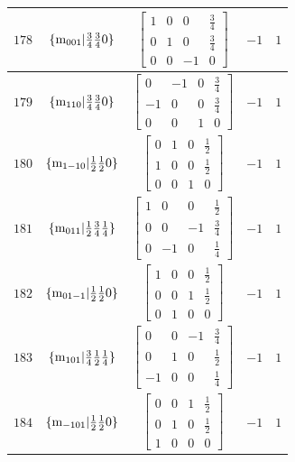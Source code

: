 \documentclass[fleqn,8pt]{jsarticle}
\begin{document}
\begin{longtable}{ccccc}
$ 178 $ & $ \{{\rm m}_{001}|\frac{3}{4} \frac{3}{4} 0\} $ & $ \begin{bmatrix} 1 & 0 & 0 & \frac{3}{4} \\ 0 & 1 & 0 & \frac{3}{4} \\ 0 & 0 & -1 & 0 \end{bmatrix} $ & $ -1 $ & $ 1 $ \\ \hline
$ 179 $ & $ \{{\rm m}_{110}|\frac{3}{4} \frac{3}{4} 0\} $ & $ \begin{bmatrix} 0 & -1 & 0 & \frac{3}{4} \\ -1 & 0 & 0 & \frac{3}{4} \\ 0 & 0 & 1 & 0 \end{bmatrix} $ & $ -1 $ & $ 1 $ \\ \hline
$ 180 $ & $ \{{\rm m}_{1-10}|\frac{1}{2} \frac{1}{2} 0\} $ & $ \begin{bmatrix} 0 & 1 & 0 & \frac{1}{2} \\ 1 & 0 & 0 & \frac{1}{2} \\ 0 & 0 & 1 & 0 \end{bmatrix} $ & $ -1 $ & $ 1 $ \\ \hline
$ 181 $ & $ \{{\rm m}_{011}|\frac{1}{2} \frac{3}{4} \frac{1}{4}\} $ & $ \begin{bmatrix} 1 & 0 & 0 & \frac{1}{2} \\ 0 & 0 & -1 & \frac{3}{4} \\ 0 & -1 & 0 & \frac{1}{4} \end{bmatrix} $ & $ -1 $ & $ 1 $ \\ \hline
$ 182 $ & $ \{{\rm m}_{01-1}|\frac{1}{2} \frac{1}{2} 0\} $ & $ \begin{bmatrix} 1 & 0 & 0 & \frac{1}{2} \\ 0 & 0 & 1 & \frac{1}{2} \\ 0 & 1 & 0 & 0 \end{bmatrix} $ & $ -1 $ & $ 1 $ \\ \hline
$ 183 $ & $ \{{\rm m}_{101}|\frac{3}{4} \frac{1}{2} \frac{1}{4}\} $ & $ \begin{bmatrix} 0 & 0 & -1 & \frac{3}{4} \\ 0 & 1 & 0 & \frac{1}{2} \\ -1 & 0 & 0 & \frac{1}{4} \end{bmatrix} $ & $ -1 $ & $ 1 $ \\ \hline
$ 184 $ & $ \{{\rm m}_{-101}|\frac{1}{2} \frac{1}{2} 0\} $ & $ \begin{bmatrix} 0 & 0 & 1 & \frac{1}{2} \\ 0 & 1 & 0 & \frac{1}{2} \\ 1 & 0 & 0 & 0 \end{bmatrix} $ & $ -1 $ & $ 1 $ \\ \hline

\end{longtable}
\end{document}
